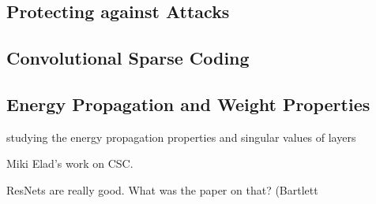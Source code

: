 \subsection{Protecting against Attacks}
\cite{cisse_parseval_2017}

\subsection{Convolutional Sparse Coding}

\cite{liu_online_2017, liu_first_2017, papyan_convolutional_2017}

\subsection{Energy Propagation and Weight Properties}
studying the energy propagation properties and singular values of layers

Miki Elad's work on CSC.

ResNets are really good. What was the paper on that?
(Bartlett


